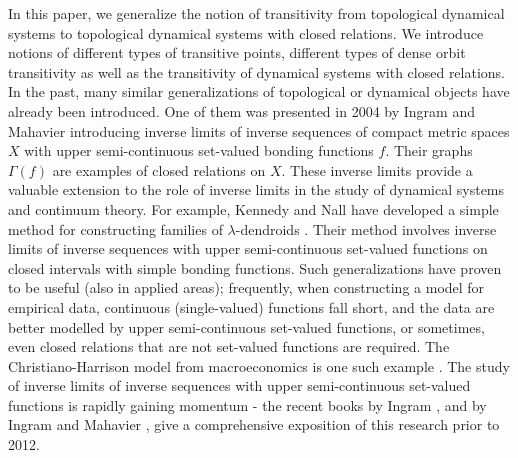 \documentclass[a4paper,12pt]{article} %
\begin{document}
In this paper, we generalize the notion of transitivity from topological dynamical systems to topological dynamical systems with closed relations.  We introduce notions of different types of transitive points, different types of dense orbit transitivity as well as the transitivity of dynamical systems with closed relations.   In the past,  many similar generalizations of topological or dynamical objects have already been introduced. One of them  was presented in 2004 by Ingram and Mahavier  \cite{ingram,mah} introducing inverse limits of inverse sequences of compact metric spaces $X$ with upper semi-continuous set-valued bonding functions $f$. Their graphs $\Gamma(f)$ are examples of closed relations on $X$.  These inverse limits provide a valuable extension to the role of inverse limits in the study of dynamical systems and continuum theory.  For example,   Kennedy and Nall  have developed a simple method for constructing families of $\lambda$-dendroids \cite{KN}. Their method involves inverse limits of inverse sequences with upper semi-continuous set-valued functions on closed intervals with simple bonding functions. 
Such generalizations have proven to be  useful (also in applied areas); frequently,  when  constructing a model for  empirical data, continuous (single-valued) functions fall short, and the data are better modelled by upper semi-continuous set-valued functions, or sometimes, even closed relations that are not set-valued functions are required. The Christiano-Harrison model   from macroeconomics is one such example \cite{christiano}.  The study of inverse limits of inverse sequences with upper semi-continuous set-valued  functions is rapidly gaining momentum - the recent books by Ingram \cite{ingram-knjiga}, and by Ingram and Mahavier \cite{ingram}, give a comprehensive exposition of this research prior to 2012.   
\end{document}
